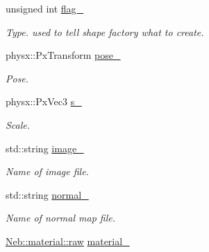 \begin{DoxyCompactItemize}
\item 
\hypertarget{classNeb_1_1Shape_1_1Base_a11c19dd2ff31af605365aca9c9682ccf}{unsigned int \hyperlink{classNeb_1_1Shape_1_1Base_a11c19dd2ff31af605365aca9c9682ccf}{flag\-\_\-}}\label{classNeb_1_1Shape_1_1Base_a11c19dd2ff31af605365aca9c9682ccf}

\begin{DoxyCompactList}\small\item\em Type. used to tell shape factory what to create. \end{DoxyCompactList}\item 
\hypertarget{classNeb_1_1Shape_1_1Base_a41645b682b7228a154fdc1482776cb27}{physx\-::\-Px\-Transform \hyperlink{classNeb_1_1Shape_1_1Base_a41645b682b7228a154fdc1482776cb27}{pose\-\_\-}}\label{classNeb_1_1Shape_1_1Base_a41645b682b7228a154fdc1482776cb27}

\begin{DoxyCompactList}\small\item\em Pose. \end{DoxyCompactList}\item 
\hypertarget{classNeb_1_1Shape_1_1Base_a42ca0cc9b1f7d1ae4cdb62ac71406d63}{physx\-::\-Px\-Vec3 \hyperlink{classNeb_1_1Shape_1_1Base_a42ca0cc9b1f7d1ae4cdb62ac71406d63}{s\-\_\-}}\label{classNeb_1_1Shape_1_1Base_a42ca0cc9b1f7d1ae4cdb62ac71406d63}

\begin{DoxyCompactList}\small\item\em Scale. \end{DoxyCompactList}\item 
\hypertarget{classNeb_1_1Shape_1_1Base_a7928c3c015047215fbea0cd14c1df2fb}{std\-::string \hyperlink{classNeb_1_1Shape_1_1Base_a7928c3c015047215fbea0cd14c1df2fb}{image\-\_\-}}\label{classNeb_1_1Shape_1_1Base_a7928c3c015047215fbea0cd14c1df2fb}

\begin{DoxyCompactList}\small\item\em Name of image file. \end{DoxyCompactList}\item 
\hypertarget{classNeb_1_1Shape_1_1Base_a15532801c8800a578073ed2869c21367}{std\-::string \hyperlink{classNeb_1_1Shape_1_1Base_a15532801c8800a578073ed2869c21367}{normal\-\_\-}}\label{classNeb_1_1Shape_1_1Base_a15532801c8800a578073ed2869c21367}

\begin{DoxyCompactList}\small\item\em Name of normal map file. \end{DoxyCompactList}\item 
\hypertarget{classNeb_1_1Shape_1_1Base_adc5a26798ca0d8806ff6625bf2b66741}{\hyperlink{structNeb_1_1material_1_1raw}{Neb\-::material\-::raw} \hyperlink{classNeb_1_1Shape_1_1Base_adc5a26798ca0d8806ff6625bf2b66741}{material\-\_\-}}\label{classNeb_1_1Shape_1_1Base_adc5a26798ca0d8806ff6625bf2b66741}


\end{DoxyCompactItemize}
